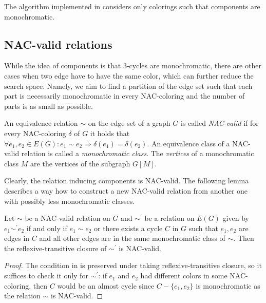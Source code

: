 The algorithm implemented in \flexrilog{}
considers only colorings such that \trcon{} components are monochromatic.

\subsection{NAC-valid relations}%
\label{sec:NACvalid}

While the idea of \trcon{} components is that 3-cycles are monochromatic,
there are other cases when two edge have to have the same color, which can further reduce the search space.
Namely, we aim to find a partition of the edge set such that each part is necessarily monochromatic
in every NAC-coloring and the number of parts is as small as possible.

\begin{definition}%
	\label{def:NACvalid}
	An equivalence relation $\sim$ on the edge set
	of a graph $G$ is called \emph{NAC-valid}
	if for every NAC-coloring $\delta$ of $G$ it holds that
	$\forall e_1, e_2 \in E(G) :
		e_1 \sim e_2 \Rightarrow \delta (e_{1}) = \delta (e_{2})$.
	An equivalence class of a NAC-valid relation is called a \emph{monochromatic class}.
	The \emph{vertices} of a monochromatic class $M$ are the vertices of the subgraph $G[M]$.
\end{definition}

Clearly, the relation inducing \trcon{} components is NAC-valid.
The following lemma describes a way how to construct a new NAC-valid relation from another one
with possibly less monochromatic classes.

\begin{lemma}%
	\label{lemma:two_edges_and_component}
	Let $\sim$ be a NAC-valid relation on $G$ and
	$\sim^\prime$ be a relation on $E(G)$ given by
	$e_{1} \sim^\prime e_{2}$ if and only if
	$e_{1} \sim e_{2}$ or there exists
	a cycle $C$ in $G$ such that $e_{1}, e_{2}$
	are edges in $C$
	and all other edges are in the same monochromatic class of $\sim$.
	Then the reflexive-transitive closure of $\sim^\prime$ is NAC-valid.
\end{lemma}
\begin{proof}
	The condition in  is preserved under taking reflexive-transitive closure,
	so it suffices to check it only for $\sim^\prime$: if $e_1$ and $e_2$ had different colors in some NAC-coloring,
	then $C$ would be an almost cycle since $C - \{e_1,e_2\}$ is monochromatic as the relation $\sim$ is NAC-valid.
\end{proof}

